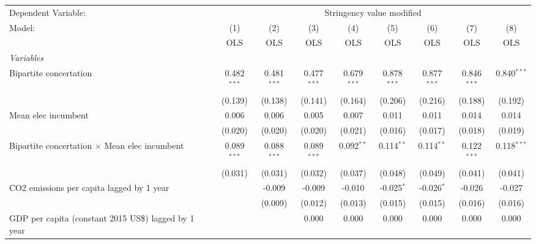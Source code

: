 
\begingroup
\centering
\begin{tabular}{lcccccccc}
   \toprule
   Dependent Variable: & \multicolumn{8}{c}{Stringency value modified}\\
   Model:                                                     & (1)           & (2)           & (3)           & (4)           & (5)           & (6)           & (7)           & (8)\\  
                                                              &  OLS          & OLS           & OLS           & OLS           & OLS           & OLS           & OLS           & OLS\\  
   \midrule
   \emph{Variables}\\
   Bipartite concertation                                     & 0.482$^{***}$ & 0.481$^{***}$ & 0.477$^{***}$ & 0.679$^{***}$ & 0.878$^{***}$ & 0.877$^{***}$ & 0.846$^{***}$ & 0.840$^{***}$\\   
                                                              & (0.139)       & (0.138)       & (0.141)       & (0.164)       & (0.206)       & (0.216)       & (0.188)       & (0.192)\\   
   Mean elec incumbent                                        & 0.006         & 0.006         & 0.005         & 0.007         & 0.011         & 0.011         & 0.014         & 0.014\\   
                                                              & (0.020)       & (0.020)       & (0.020)       & (0.021)       & (0.016)       & (0.017)       & (0.018)       & (0.019)\\   
   Bipartite concertation $\times$ Mean elec incumbent        & 0.089$^{***}$ & 0.088$^{***}$ & 0.089$^{***}$ & 0.092$^{**}$  & 0.114$^{**}$  & 0.114$^{**}$  & 0.122$^{***}$ & 0.118$^{***}$\\   
                                                              & (0.031)       & (0.031)       & (0.032)       & (0.037)       & (0.048)       & (0.049)       & (0.041)       & (0.041)\\   
   CO2 emissions per capita lagged by 1 year                  &               & -0.009        & -0.009        & -0.010        & -0.025$^{*}$  & -0.026$^{*}$  & -0.026        & -0.027\\   
                                                              &               & (0.009)       & (0.012)       & (0.013)       & (0.015)       & (0.015)       & (0.016)       & (0.016)\\   
   GDP per capita (constant 2015 US\$) lagged by 1 year       &               &               & 0.000         & 0.000         & 0.000         & 0.000         & 0.000         & 0.000\\   

\end{tabular}
